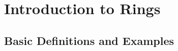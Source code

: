 \documentclass[../main]{subfiles}
\begin{document}
\section{Introduction to Rings}


\subsection{Basic Definitions and Examples}


 
 
 
 
 
 
 
 
 
 
 
 
 
 
 
 
 
 
 
 
 
 
 
 
 
 
\end{document}
